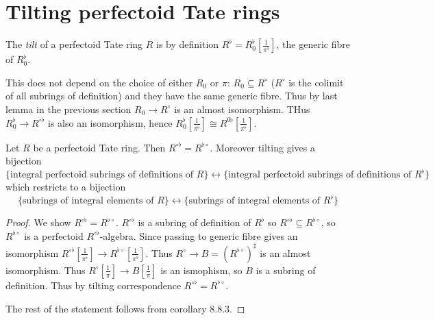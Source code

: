 \documentclass[a4paper]{article}
\newcommand{\tilt}{\flat} %
\begin{document}
\section{Tilting perfectoid Tate rings}

\begin{definition}
  The \emph{tilt} of a perfectoid Tate ring \(R\) is by definition \(R^\tilt = R_0^\tilt[\frac{1}{\pi^\tilt}]\), the generic fibre of \(R_0^\tilt\).
\end{definition}

This does not depend on the choice of either \(R_0\) or \(\pi\): \(R_0 \subseteq R^\circ\) (\(R^\circ\) is the colimit of all subrings of definition) and they have the same generic fibre. Thus by last lemma in the previous section \(R_0 \to R^\circ\) is an almost isomorphism. THus \(R_0^\tilt \to R^{\circ \tilt}\) is also an isomorphism, hence \(R_0^\tilt[\frac{1}{\pi^\tilt}] \cong R^{0\tilt}[\frac{1}{\pi^\tilt}]\).

\begin{theorem}
  Let \(R\) be a perfectoid Tate ring. Then \(R^{\circ \tilt} = R^{\tilt \circ}\). Moreover tilting gives a bijection
  \[
    \{\text{integral perfectoid subrings of definitions of } R\}
    \longleftrightarrow
    \{\text{integral perfectoid subrings of definitions of } R^\tilt\}
  \]
  which restricts to a bijection
  \[
    \{\text{subrings of integral elements of } R\}
    \longleftrightarrow
    \{\text{subrings of integral elements of } R^\tilt\}
  \]
\end{theorem}

\begin{proof}
  We show \(R^{\circ \tilt} = R^{\tilt \circ}\). \(R^{\circ \tilt}\) is a subring of definition of \(R^\tilt\) so \(R^{\circ \tilt} \subseteq R^{\tilt \circ}\), so \(R^{\tilt \circ}\) is a perfectoid \(R^{\circ \tilt}\)-algebra. Since passing to generic fibre gives an isomorphism \(R^{\circ \tilt}[\frac{1}{\pi^\tilt}] \to R^{\tilt \circ}[\frac{1}{\pi^\tilt}]\). Thus \(R^\circ \to B = (R^{\tilt \circ})^\sharp\) is an almost isomorphism. Thus \(R^\circ[\frac{1}{\pi}] \to B[\frac{1}{\pi}]\) is an ismophism, so \(B\) is a subring of definition. Thus by tilting correspondence \(R^{\circ \tilt} = R^{\tilt \circ}\).

  The rest of the statement follows from corollary 8.8.3.
\end{proof}
\end{document}
